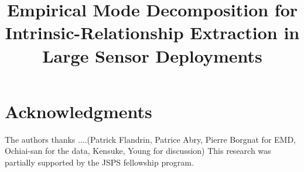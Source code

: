 \documentclass[conference]{IEEEtran}
\begin{document}
\title{Empirical Mode Decomposition for Intrinsic-Relationship Extraction in Large Sensor Deployments}


\author{
\and
{}
\and
{}
}


\maketitle

% 
% 










\section*{Acknowledgments}
The authors thanks ....(Patrick Flandrin, Patrice Abry, Pierre Borgnat for EMD, Ochiai-san for the data, Kensuke, Young for discussion)
This research was partially supported by the JSPS fellowship program.



\end{document}
